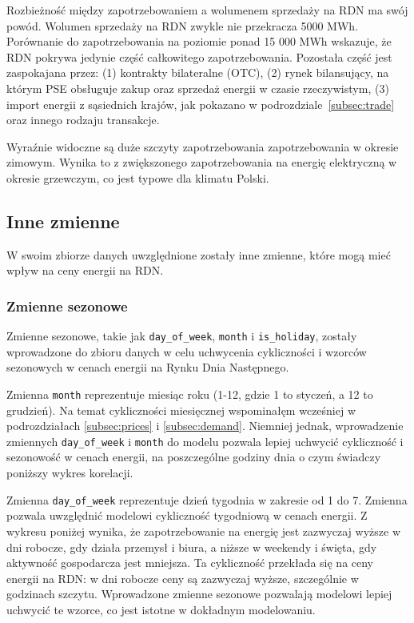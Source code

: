 Rozbieżność między zapotrzebowaniem a wolumenem sprzedaży na RDN ma swój powód. Wolumen sprzedaży na RDN zwykle nie przekracza 5000 MWh. Porównanie do zapotrzebowania na poziomie ponad 15 000  MWh wskazuje, że RDN pokrywa jedynie część całkowitego zapotrzebowania. Pozostała część jest zaspokajana przez: (1) kontrakty bilateralne (OTC), (2) rynek bilansujący, na którym PSE obsługuje zakup oraz sprzedaż energii w czasie rzeczywistym, (3) import energii z sąsiednich krajów, jak pokazano w podrozdziale~\ref{subsec:trade} oraz innego rodzaju transakcje. 

Wyraźnie widoczne są duże szczyty zapotrzebowania zapotrzebowania w okresie zimowym. Wynika to z zwiększonego zapotrzebowania na energię elektryczną w okresie grzewczym, co jest typowe dla klimatu Polski.

\subsection{Inne zmienne}
\label{subsec:seasonal}

W swoim zbiorze danych uwzględnione zostały inne zmienne, które mogą mieć wpływ na ceny energii na RDN.

\subsubsection{Zmienne sezonowe}
\label{subsubsec:seasonal_variables}
Zmienne sezonowe, takie jak \texttt{day\_of\_week}, \texttt{month} i \texttt{is\_holiday}, zostały wprowadzone do zbioru danych w celu uchwycenia cykliczności i wzorców sezonowych w cenach energii na Rynku Dnia Następnego.

Zmienna \texttt{month} reprezentuje miesiąc roku (1-12, gdzie 1 to styczeń, a 12 to grudzień). Na temat cykliczności miesięcznej wspominałęm wcześniej w podrozdziałach \ref{subsec:prices} i \ref{subsec:demand}. Niemniej jednak, wprowadzenie zmiennych \texttt{day\_of\_week} i \texttt{month} do modelu pozwala lepiej uchwycić cykliczność i sezonowość w cenach energii, na poszczególne godziny dnia o czym świadczy poniższy wykres korelacji.

Zmienna \texttt{day\_of\_week} reprezentuje dzień tygodnia w zakresie od 1 do 7. Zmienna pozwala uwzględnić modelowi cykliczność tygodniową w cenach energii. Z wykresu poniżej wynika, że zapotrzebowanie na energię jest zazwyczaj wyższe w dni robocze, gdy działa przemysł i biura, a niższe w weekendy i święta, gdy aktywność gospodarcza jest mniejsza. Ta cykliczność przekłada się na ceny energii na RDN: w dni robocze ceny są zazwyczaj wyższe, szczególnie w godzinach szczytu. Wprowadzone zmienne sezonowe pozwalają modelowi lepiej uchwycić te wzorce, co jest istotne w dokładnym modelowaniu.

